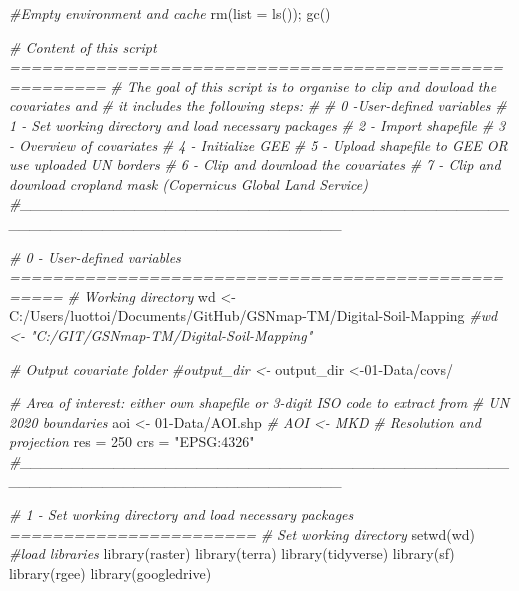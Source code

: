 \documentclass[
  10pt,
  b5paper,
  oneside]{book}
\newenvironment{Shaded}{\begin{snugshade}}{\end{snugshade}}
\newcommand{\AttributeTok}[1]{\textcolor[rgb]{0.77,0.63,0.00}{#1}}
\newcommand{\CommentTok}[1]{\textcolor[rgb]{0.56,0.35,0.01}{\textit{#1}}}
\newcommand{\DecValTok}[1]{\textcolor[rgb]{0.00,0.00,0.81}{#1}}
\newcommand{\FunctionTok}[1]{\textcolor[rgb]{0.00,0.00,0.00}{#1}}
\newcommand{\NormalTok}[1]{#1}
\newcommand{\OtherTok}[1]{\textcolor[rgb]{0.56,0.35,0.01}{#1}}
\newcommand{\StringTok}[1]{\textcolor[rgb]{0.31,0.60,0.02}{#1}}
\begin{document}
\begin{Shaded}
\begin{Highlighting}[]
\CommentTok{\#Empty environment and cache}
\FunctionTok{rm}\NormalTok{(}\AttributeTok{list =} \FunctionTok{ls}\NormalTok{());}
\FunctionTok{gc}\NormalTok{()}

\CommentTok{\# Content of this script =======================================================}
\CommentTok{\# The goal of this script is to organise to clip and dowload the covariates and }
\CommentTok{\# it includes the following steps:}
\CommentTok{\# }
\CommentTok{\# 0 {-}User{-}defined variables }
\CommentTok{\# 1 {-} Set working directory and load necessary packages}
\CommentTok{\# 2 {-} Import shapefile}
\CommentTok{\# 3 {-} Overview of covariates }
\CommentTok{\# 4 {-} Initialize GEE}
\CommentTok{\# 5 {-} Upload shapefile to GEE OR use uploaded UN borders}
\CommentTok{\# 6 {-} Clip and download the covariates}
\CommentTok{\# 7 {-} Clip and download cropland mask (Copernicus Global Land Service)}
\CommentTok{\#\_\_\_\_\_\_\_\_\_\_\_\_\_\_\_\_\_\_\_\_\_\_\_\_\_\_\_\_\_\_\_\_\_\_\_\_\_\_\_\_\_\_\_\_\_\_\_\_\_\_\_\_\_\_\_\_\_\_\_\_\_\_\_\_\_\_\_\_\_\_\_\_\_\_\_\_\_\_\_}


\CommentTok{\# 0 {-} User{-}defined variables ===================================================}
\CommentTok{\# Working directory}
\NormalTok{wd }\OtherTok{\textless{}{-}} \StringTok{\textquotesingle{}C:/Users/luottoi/Documents/GitHub/GSNmap{-}TM/Digital{-}Soil{-}Mapping\textquotesingle{}}
\CommentTok{\#wd \textless{}{-} "C:/GIT/GSNmap{-}TM/Digital{-}Soil{-}Mapping"}

\CommentTok{\# Output covariate folder}
\CommentTok{\#output\_dir \textless{}{-}\textquotesingle{}\textquotesingle{}}
\NormalTok{output\_dir }\OtherTok{\textless{}{-}}\StringTok{\textquotesingle{}01{-}Data/covs/\textquotesingle{}}

\CommentTok{\# Area of interest: either own shapefile or 3{-}digit ISO code to extract from }
\CommentTok{\# UN 2020 boundaries}
\NormalTok{aoi }\OtherTok{\textless{}{-}} \StringTok{\textquotesingle{}01{-}Data/AOI.shp\textquotesingle{}}
\CommentTok{\# AOI \textless{}{-} \textquotesingle{}MKD\textquotesingle{}}
\CommentTok{\# Resolution and projection}
\NormalTok{res }\OtherTok{=} \DecValTok{250}
\NormalTok{crs }\OtherTok{=} \StringTok{"EPSG:4326"}
\CommentTok{\#\_\_\_\_\_\_\_\_\_\_\_\_\_\_\_\_\_\_\_\_\_\_\_\_\_\_\_\_\_\_\_\_\_\_\_\_\_\_\_\_\_\_\_\_\_\_\_\_\_\_\_\_\_\_\_\_\_\_\_\_\_\_\_\_\_\_\_\_\_\_\_\_\_\_\_\_\_\_\_}

\CommentTok{\#  1 {-} Set working directory and load necessary packages ======================= }
\CommentTok{\# Set working directory}
\FunctionTok{setwd}\NormalTok{(wd)}
\CommentTok{\#load libraries}
\FunctionTok{library}\NormalTok{(raster)}
\FunctionTok{library}\NormalTok{(terra)}
\FunctionTok{library}\NormalTok{(tidyverse)}
\FunctionTok{library}\NormalTok{(sf)}
\FunctionTok{library}\NormalTok{(rgee)}
\FunctionTok{library}\NormalTok{(googledrive)}



\end{Highlighting}
\end{Shaded}
\end{document}
